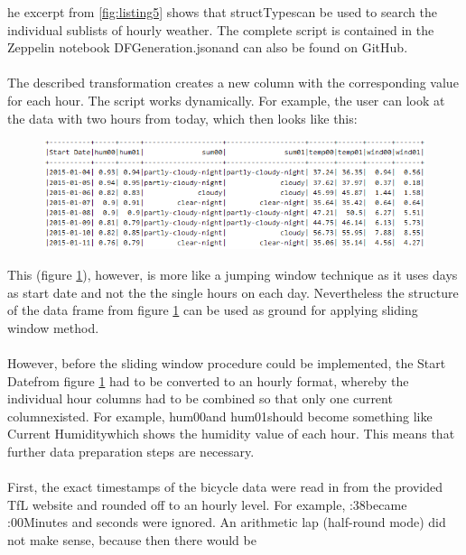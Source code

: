 he excerpt from \ref{fig:listing5} shows that \glqq structTypes\grqq can be used to search the individual sublists
of \glqq hourly weather\grqq .
The complete script is contained in the Zeppelin notebook \glqq DFGeneration.json\grqq and can also be found on GitHub.
\\\\
The described transformation creates a new column with the corresponding value for each hour.
The script works dynamically. For example, the user can look at the data with two hours from today,
which then looks like this:
\begin{figure}[H]
\hspace{-1.6cm}
\includegraphics[width=1.2\textwidth]{img/figure7_weather_df}\label{fig:figure7_weather_df}
\label{fig:figure7_weather_df}
\end{figure}
This (figure \ref{fig:figure7_weather_df}), however, is more like a jumping window technique as it uses days as start date
and not the the single hours on each day. Nevertheless the structure of the data frame from figure \ref{fig:figure7_weather_df} can be used as ground for applying sliding window method.\\\\
However, before the sliding window procedure could be implemented, the \glqq Start Date\grqq from figure \ref{fig:figure7_weather_df} had to be converted to an hourly format, whereby the individual hour columns had to be
combined so that only one \glqq current column\grqq existed. For example, \glqq hum00\grqq and \glqq hum01\grqq should
become something like \glqq Current Humidity\grqq  which shows the humidity value of each hour. This
means that further data preparation steps are necessary.\\\\
First, the exact timestamps of the bicycle data were read in from the provided TfL website and
rounded off to an hourly level. For example, :38\grqq became :00\grqq  Minutes and seconds were
ignored. An arithmetic lap (half-round mode) did not make sense, because then there would be
